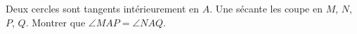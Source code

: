 Deux cercles sont tangents intérieurement en $A$. Une sécante les coupe en $M$, $N$, $P$, $Q$. Montrer que $\angle MAP = \angle NAQ$.
